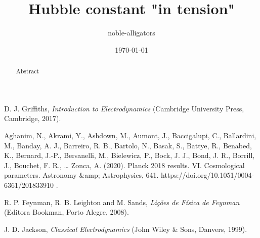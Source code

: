 \documentclass[a4paper, amsfonts, amssymb, amsmath, reprint, showkeys, nofootinbib, twoside]{revtex4-1}
\begin{document}
\title{Hubble constant "in tension"}

\author{noble-alligators}

\date{\today} %

\begin{abstract}
Abstract
\end{abstract}



\maketitle






\begin{thebibliography}{4}
D. J. Griffiths,
\textit{Introduction to Electrodynamics}
(Cambridge University Press, Cambridge, 2017).

Aghanim, N., Akrami, Y., Ashdown, M., Aumont, J., Baccigalupi, C., Ballardini, M., Banday, A. J., Barreiro, R. B., Bartolo, N., Basak, S., Battye, R., Benabed, K., Bernard, J.-P., Bersanelli, M., Bielewicz, P., Bock, J. J., Bond, J. R., Borrill, J., Bouchet, F. R., … Zonca, A. (2020). Planck 2018 results. VI. Cosmological parameters. Astronomy &amp; Astrophysics, 641. https://doi.org/10.1051/0004-6361/201833910 .

R. P. Feynman, R. B. Leighton and M. Sands,
\textit{Lições de Física de Feynman}
(Editora Bookman, Porto Alegre, 2008).

J. D. Jackson,
\textit{Classical Electrodynamics}
(John Wiley \& Sons, Danvers, 1999).
\end{thebibliography}

\appendix*

\end{document}
